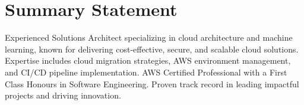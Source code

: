 
\section{Summary Statement}
Experienced Solutions Architect specializing in cloud architecture and machine learning, known for delivering cost-effective, secure, and scalable cloud solutions. Expertise includes cloud migration strategies, AWS environment management, and CI/CD pipeline implementation. AWS Certified Professional with a First Class Honours in Software Engineering. Proven track record in leading impactful projects and driving innovation.
